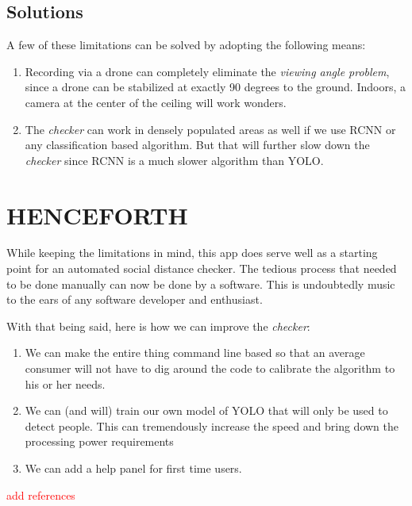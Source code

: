 \documentclass[a4paper]{article}
\begin{document}
\subsection{Solutions}

A few of these limitations can be solved by adopting the following means:

\begin{enumerate}
    \item Recording via a drone can completely eliminate the \textit{viewing angle problem}, since a drone can be stabilized at exactly 90 degrees to the ground. Indoors, a camera at the center of the ceiling will work wonders.
    \item The \textit{checker} can work in densely populated areas as well if we use RCNN or any classification based algorithm. But that will further slow down the \textit{checker} since RCNN is a much slower algorithm than YOLO.
\end{enumerate}

\pagebreak

\section{HENCEFORTH}

While keeping the limitations in mind, this app does serve well as a starting point for an automated social distance checker. The tedious process that needed to be done manually can now be done by a software. This is undoubtedly music to the ears of any software developer and enthusiast.

With that being said, here is how we can improve the \textit{checker}:

\begin{enumerate}
    \item We can make the entire thing command line based so that an average consumer will not have to dig around the code to calibrate the algorithm to his or her needs.
    \item We can (and will) train our own model of YOLO that will only be used to detect people. This can tremendously increase the speed and bring down the processing power requirements
    \item We can add a help panel for first time users.
\end{enumerate}

\textcolor{red}{add references}
\end{document}
